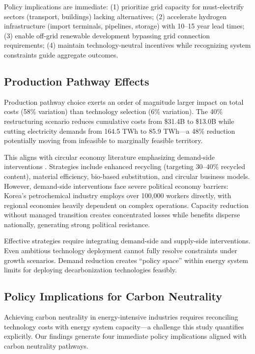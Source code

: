 \documentclass[11pt,a4paper]{article}
\begin{document}
Policy implications are immediate: (1) prioritize grid capacity for must-electrify sectors (transport, buildings) lacking alternatives; (2) accelerate hydrogen infrastructure (import terminals, pipelines, storage) with 10--15 year lead times; (3) enable off-grid renewable development bypassing grid connection requirements; (4) maintain technology-neutral incentives while recognizing system constraints guide aggregate outcomes.

\subsection{Production Pathway Effects}

Production pathway choice exerts an order of magnitude larger impact on total costs (58\% variation) than technology selection (6\% variation). The 40\% restructuring scenario reduces cumulative costs from \$31.4B to \$13.0B while cutting electricity demands from 164.5 TWh to 85.9 TWh---a 48\% reduction potentially moving from infeasible to marginally feasible territory.

This aligns with circular economy literature emphasizing demand-side interventions \citep{Kloo2024,EllenMacArthur2019,MaterialEconomics2019}. Strategies include enhanced recycling (targeting 30--40\% recycled content), material efficiency, bio-based substitution, and circular business models. However, demand-side interventions face severe political economy barriers: Korea's petrochemical industry employs over 100,000 workers directly, with regional economies heavily dependent on complex operations. Capacity reduction without managed transition creates concentrated losses while benefits disperse nationally, generating strong political resistance.

Effective strategies require integrating demand-side and supply-side interventions. Even ambitious technology deployment cannot fully resolve constraints under growth scenarios. Demand reduction creates ``policy space'' within energy system limits for deploying decarbonization technologies feasibly.

\subsection{Policy Implications for Carbon Neutrality}

Achieving carbon neutrality in energy-intensive industries requires reconciling technology costs with energy system capacity---a challenge this study quantifies explicitly. Our findings generate four immediate policy implications aligned with carbon neutrality pathways.
\end{document}
